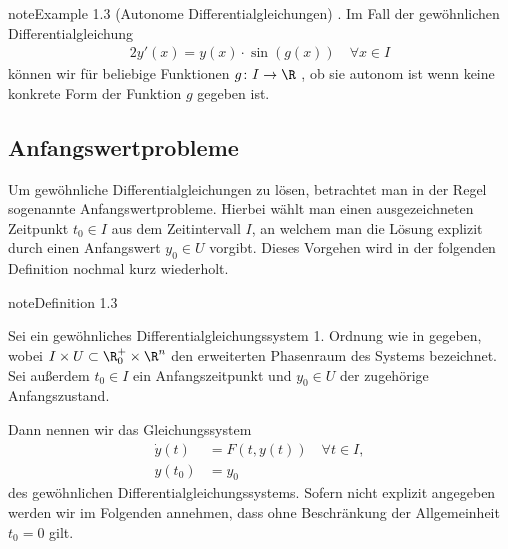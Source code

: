 \documentclass[letterpaper,10pt,english]{jupyterBook}
\begin{document}
\begin{sphinxadmonition}{note}{Example 1.3 (Autonome Differentialgleichungen)}
. Im Fall der gewöhnlichen Differentialgleichung
\begin{equation*}
\begin{split}2y'(x) = y(x)\cdot \sin(g(x)) \quad \forall x \in I\end{split}
\end{equation*}
\sphinxAtStartPar
können wir für beliebige Funktionen \(g \colon I \rightarrow \R\) , ob sie autonom ist wenn keine konkrete Form der Funktion \(g\) gegeben ist.
\end{sphinxadmonition}


\subsection{Anfangswertprobleme}
\label{\detokenize{ode/repetition:anfangswertprobleme}}
\sphinxAtStartPar
Um gewöhnliche Differentialgleichungen zu lösen, betrachtet man in der Regel sogenannte Anfangswertprobleme.
Hierbei wählt man einen ausgezeichneten Zeitpunkt \(t_0\in I\) aus dem Zeitintervall \(I\), an welchem man die Lösung explizit durch einen Anfangswert \(y_0\in U\) vorgibt.
Dieses Vorgehen wird in der folgenden Definition nochmal kurz wiederholt.
\label{ode/repetition:def:anfangswertproblem}
\begin{sphinxadmonition}{note}{Definition 1.3}



\sphinxAtStartPar
Sei ein gewöhnliches Differentialgleichungssystem 1. Ordnung wie in {\hyperref[\detokenize{ode/repetition:def:DGL}]{}} gegeben, wobei \(I \times U \subset \R_0^+ \times \R^n\) den erweiterten Phasenraum des Systems bezeichnet.
Sei außerdem \(t_0 \in I\) ein Anfangszeitpunkt und \(y_0 \in U\) der zugehörige Anfangszustand.

\sphinxAtStartPar
Dann nennen wir das Gleichungssystem
\begin{equation}\label{equation:ode/repetition:eq:AWP}
\begin{split}\dot{y}(t) &= F(t, y(t))\quad\forall t\in I, \\
y(t_0) &= y_0\end{split}
\end{equation}
\sphinxAtStartPar
{} des gewöhnlichen Differentialgleichungssystems.
Sofern nicht explizit angegeben werden wir im Folgenden annehmen, dass ohne Beschränkung der Allgemeinheit \(t_0=0\) gilt.
\end{sphinxadmonition}
\end{document}
